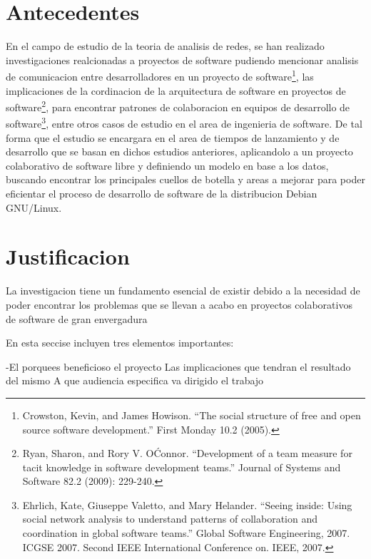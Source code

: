 \documentclass[12pt]{report}
\begin{document}
\chapter*{Antecedentes}
En el campo de estudio de la teoria de analisis de redes, se han
realizado investigaciones realcionadas a proyectos de software
pudiendo mencionar analisis de comunicacion entre desarrolladores en
un proyecto de software\footnote{Crowston, Kevin, and James Howison.
  ``The social structure of free and open source software
  development.''  First Monday 10.2 (2005).}, las implicaciones de la
cordinacion de la arquitectura de software en proyectos de
software\footnote{Ryan, Sharon, and Rory V. O\'Connor. ``Development
  of a team measure for tacit knowledge in software development
  teams.'' Journal of Systems and Software 82.2 (2009): 229-240.},
para encontrar patrones de colaboracion en equipos de desarrollo de
software\footnote{Ehrlich, Kate, Giuseppe Valetto, and Mary
  Helander. ``Seeing inside: Using social network analysis to
  understand patterns of collaboration and coordination in global
  software teams.'' Global Software Engineering, 2007. ICGSE
  2007. Second IEEE International Conference on. IEEE, 2007.}, entre
otros casos de estudio en el area de ingenieria de software. De tal
forma que el estudio se encargara en el area de tiempos de lanzamiento
y de desarrollo que se basan en dichos estudios anteriores,
aplicandolo a un proyecto colaborativo de software libre y definiendo
un modelo en base a los datos, buscando encontrar los principales
cuellos de botella y areas a mejorar para poder eficientar el proceso
de desarrollo de software de la distribucion Debian GNU/Linux.

\chapter*{Justificacion}
La investigacion tiene un fundamento esencial de existir debido a la necesidad
de poder encontrar los problemas que se llevan a acabo en proyectos colaborativos de software
de gran envergadura

En esta seccise incluyen tres elementos importantes:

-El porquees beneficioso el proyecto
Las implicaciones que tendran el resultado del mismo
A que audiencia especifica va dirigido el trabajo
\end{document}
